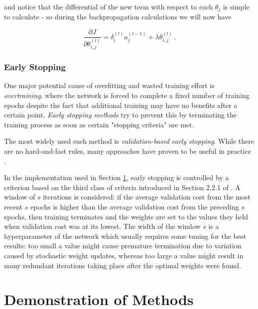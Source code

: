 \documentclass{article}[11pt]
\begin{document}
            and notice that the differential of the new term with respect to each $\theta_j$ is simple to calculate - so during the backpropagation calculations we will now have
            
            $$
            \frac{\partial J}{\partial \theta^{(l)}_{i,j}} = \delta^{(l)}_i a^{(l-1)}_j + \lambda \theta^{(l)}_{i,j} \,.
            $$
            
        
        
        \subsubsection{Early Stopping} \label{sec:early_stopping}
            
            One major potential cause of overfitting and wasted training effort is \textit{overtraining}, where the network is forced to complete a fixed number of training epochs despite the fact that additional training may have no benefits after a certain point. \textit{Early stopping methods} try to prevent this by terminating the training process as soon as certain "stopping criteria" are met.
            
            The most widely used such method is \textit{validation-based early stopping}. While there are no hard-and-fast rules, many approaches have proven to be useful in practice \cite{early_stopping}.
            
            In the implementation used in Section \ref{sec:demos}, early stopping is controlled by a criterion based on the third class of criteria introduced in Section 2.2.1 of \cite{early_stopping}. A window of $s$ iterations is considered: if the average validation cost from the most recent $s$ epochs is higher than the average validation cost from the preceding $s$ epochs, then training terminates and the weights are set to the values they held when validation cost was at its lowest. The width of the window $s$ is a hyperparameter of the network which usually requires some tuning for the best results: too small a value might cause premature termination due to variation caused by stochastic weight updates, whereas too large a value might result in many redundant iterations taking place after the optimal weights were found.
            
            

\section{Demonstration of Methods} \label{sec:demos}
    
\end{document}
